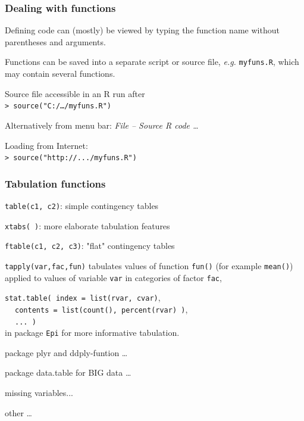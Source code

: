 \documentclass[handout,12pt]{beamer}
\begin{document}
\begin{frame}\frametitle{Dealing with functions}

\bi
\item Defining code can (mostly) be viewed by typing the function name
  without parentheses and arguments.
  \medskip
\item Functions can be saved into a separate script 
 or source file, {\it e.g.} {\tt myfuns.R}, 
   which may contain several functions.
   \medskip
\item Source file accessible in an R run after \\
	{\tt > source("C:/\dots/myfuns.R") } 
	\medskip
\item Alternatively from menu bar: {\it File -- Source R code \dots} 
\medskip
\item Loading from Internet:\\
{\tt > source("http://.../myfuns.R")}
\ei
\end{frame} 




\begin{frame}
\frametitle{Tabulation functions}

\bi
\item {\tt table(c1, c2)}: simple contingency tables
\item {\tt xtabs( )}: more elaborate tabulation features 
\item {\tt ftable(c1, c2, c3)}: "flat" contingency tables 
\item {\tt tapply(var,fac,fun)} tabulates values of function 
{\tt fun()} (for example {\tt mean()}) 
applied to values of variable {\tt var} in categories of factor 
{\tt fac},
\item {\tt stat.table( index = list(rvar, cvar)}, \\
$\ \ { } \ \ $ 
{\tt contents = list(count(), percent(rvar) )}, \\
$\ \ { } \ \ $ {\tt ... )} \\
 in package {\tt Epi} for more informative tabulation.
\item package plyr and ddply-funtion \dots
\item package data.table for BIG data \dots
\item missing variables...
\item other \dots
\ei
\end{frame} 
\end{document}
